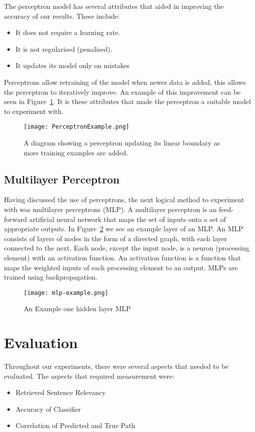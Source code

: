 \documentclass[bsc,frontabs,twoside,singlespacing,parskip,deptreport]{infthesis}     %
\begin{document}
The perceptron model has several attributes that aided in improving the accuracy of our results.
These include:
\begin{itemize}
\item It does not require a learning rate.
\item It is not regularised (penalised).
\item It updates its model only on mistakes
\end{itemize}

Perceptrons allow retraining of the model when newer data is added, this allows the perceptron to
iteratively improve. An example of this improvement can be seen in Figure~\ref{fig:perceptronExample}.
It is these attributes that made the perceptron a suitable model to experiment with.
\begin{figure}[H]
  \centering
  \texttt{[image: PerceptronExample.png]}
  \caption{A diagram showing a perceptron updating its linear boundary as more training examples are added. }
\label{fig:perceptronExample}
\end{figure}

\subsection{Multilayer Perceptron}
Having discussed the use of perceptrons, the next logical method to experiment with was multilayer perceptrons (MLP).
A multilayer perceptron is an feed-forward artificial neural network that maps the set of inputs
onto a set of appropriate outputs.
In Figure~\ref{fig:mlp} we see an example layer of an MLP.
An MLP consists of layers of  nodes in the form of a directed graph, with each layer connected to the next.
Each node, except the input node, is a neuron (processing element) with an activation function. %
An activation function is a function that maps the weighted inputs of each processing element to an output.
MLPs are trained using backpropagation.

\begin{figure}[H]
  \centering
  \texttt{[image: mlp-example.png]}
  \caption{An Example one hidden layer MLP \cite{scikit-learn}}
  \label{fig:mlp}
\end{figure}

\section{Evaluation}
Throughout our experiments, there were several aspects that needed to be evaluated.
The aspects that required measurement were:
\begin{itemize}
  \item Retrieved Sentence Relevancy
  \item Accuracy of Classifier
  \item Correlation of Predicted and True Path
\end{itemize}
\end{document}
